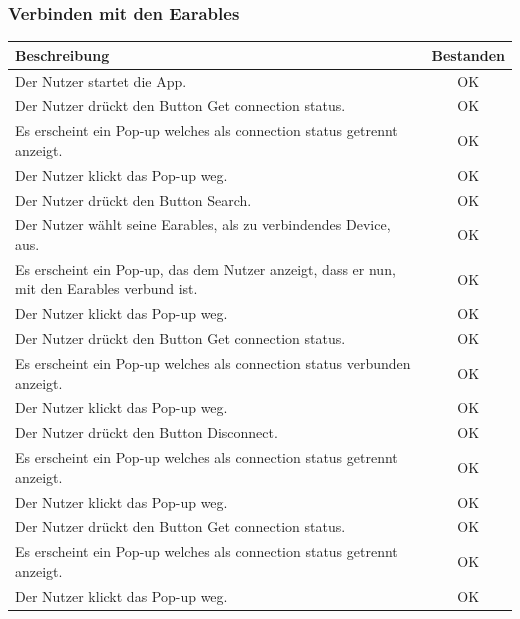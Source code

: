 \documentclass[a4paper,12pt]{article}
\newcommand{\testok}[0]{
	\cellcolor{green!25} OK
}
\begin{document}
\subsubsection{Verbinden mit den Earables}
\begin{tabular}{ | p{12cm} | c| }
	\hline
	\textbf{Beschreibung} & \textbf{Bestanden}\\
	\hline
	Der Nutzer startet die App. &\testok \\
	\hline
	Der Nutzer drückt den Button \glqq{}Get  connection status\grqq{}. & \testok \\
	\hline
	Es erscheint ein Pop-up welches als connection status \glqq{}getrennt\grqq{} anzeigt. & \testok \\
	\hline
	Der Nutzer klickt das Pop-up weg. & \testok \\
	\hline
	Der Nutzer drückt den Button \glqq{}Search\grqq{}. & \testok \\
	\hline
	Der Nutzer wählt seine Earables, als zu verbindendes Device, aus. & \testok \\
	\hline
	Es erscheint ein Pop-up, das dem Nutzer anzeigt, dass er nun, mit den Earables verbund ist. & \testok \\
	\hline
	Der Nutzer klickt das Pop-up weg. & \testok \\
	\hline
	Der Nutzer drückt den Button \glqq{}Get  connection status\grqq{}. & \testok \\
	\hline
	Es erscheint ein Pop-up welches als connection status \glqq{}verbunden\grqq{} anzeigt. & \testok \\
	\hline
	Der Nutzer klickt das Pop-up weg. & \testok \\
	\hline
	Der Nutzer drückt den Button \glqq{}Disconnect\grqq{}. & \testok \\
	\hline
	Es erscheint ein Pop-up welches als connection status \glqq{}getrennt\grqq{} anzeigt. & \testok \\
	\hline
	Der Nutzer klickt das Pop-up weg. & \testok \\
	\hline
	Der Nutzer drückt den Button \glqq{}Get  connection status\grqq{}. & \testok \\
	\hline
	Es erscheint ein Pop-up welches als connection status \glqq{}getrennt\grqq{} anzeigt. & \testok \\
	\hline
	Der Nutzer klickt das Pop-up weg. & \testok \\
	\hline
\end{tabular}
\end{document}
